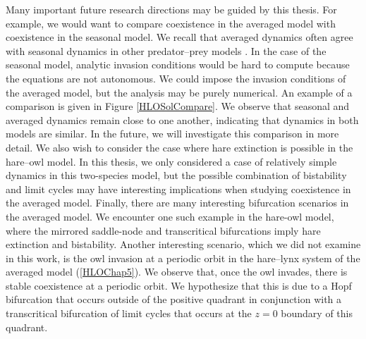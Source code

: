 \documentclass[12pt]{UOthesis}
\theoremstyle{remarkstyle}
\begin{document}
Many important future research directions may be guided by this thesis. For example, we would want to compare coexistence in the averaged model with coexistence in the seasonal model. We recall that averaged dynamics often agree with seasonal dynamics in other predator--prey models \cite{HsuZhao, TysonLutscher}. In the case of the seasonal model, analytic invasion conditions would be hard to compute because the equations are not autonomous. We could impose the invasion conditions of the averaged model, but the analysis may be purely numerical. An example of a comparison is given in Figure \ref{HLOSolCompare}. We observe that seasonal and averaged dynamics remain close to one another, indicating that dynamics in both models are similar. In the future, we will investigate this comparison in more detail. We also wish to consider the case where hare extinction is possible in the hare--owl model. In this thesis, we only considered a case of relatively simple dynamics in this two-species model, but the possible combination of bistability and limit cycles may have interesting implications when studying coexistence in the averaged model. Finally, there are many interesting bifurcation scenarios in the averaged model. We encounter one such example in the hare-owl model, where the mirrored saddle-node and transcritical bifurcations imply hare extinction and bistability. Another interesting scenario, which we did not examine in this work, is the owl invasion at a periodic orbit in the hare--lynx system of the averaged model (\ref{HLOChap5}). We observe that, once the owl invades, there is stable coexistence at a periodic orbit. We hypothesize that this is due to a Hopf bifurcation that occurs outside of the positive quadrant in conjunction with a transcritical bifurcation of limit cycles that occurs at the $z=0$ boundary of this quadrant.
\end{document}
